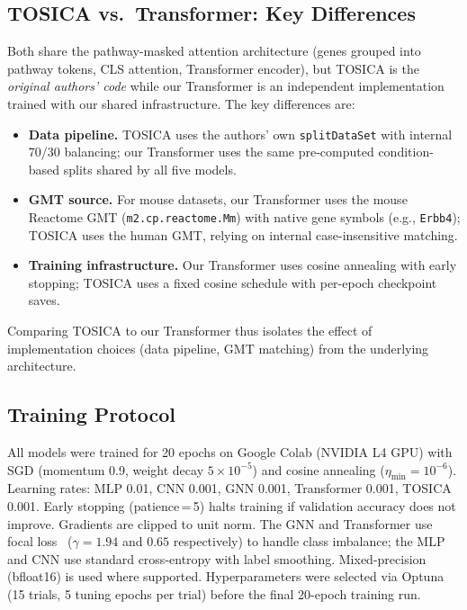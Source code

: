 \documentclass[11pt,letterpaper]{article}
\begin{document}
\subsection{TOSICA vs.\ Transformer: Key Differences}
Both share the pathway-masked attention architecture (genes grouped into pathway
tokens, CLS attention, Transformer encoder), but TOSICA is the \emph{original
authors' code} while our Transformer is an independent implementation trained
with our shared infrastructure. The key differences are:
\begin{itemize}
    \item \textbf{Data pipeline.} TOSICA uses the authors' own
    \texttt{splitDataSet} with internal 70/30 balancing; our Transformer uses
    the same pre-computed condition-based splits shared by all five models.
    \item \textbf{GMT source.} For mouse datasets, our Transformer uses the
    mouse Reactome GMT (\texttt{m2.cp.reactome.Mm}) with native gene symbols
    (e.g., \texttt{Erbb4}); TOSICA uses the human GMT, relying on internal
    case-insensitive matching.
    \item \textbf{Training infrastructure.} Our Transformer uses cosine
    annealing with early stopping; TOSICA uses a fixed cosine schedule with
    per-epoch checkpoint saves.
\end{itemize}
\noindent Comparing TOSICA to our Transformer thus isolates the effect of
implementation choices (data pipeline, GMT matching) from the underlying
architecture.

\subsection{Training Protocol}
All models were trained for 20 epochs on Google Colab (NVIDIA L4 GPU) with SGD
(momentum 0.9, weight decay $5{\times}10^{-5}$) and cosine annealing
($\eta_{\min}{=}10^{-6}$). Learning rates: MLP 0.01, CNN 0.001, GNN 0.001,
Transformer 0.001, TOSICA 0.001. Early stopping (patience\,=\,5) halts
training if validation accuracy does not improve. Gradients are clipped to unit
norm. The GNN and Transformer use focal loss~\cite{lin2017focal}
($\gamma{=}1.94$ and $0.65$ respectively) to handle class imbalance; the MLP
and CNN use standard cross-entropy with label smoothing. Mixed-precision
(bfloat16) is used where supported. Hyperparameters were selected via Optuna
(15 trials, 5 tuning epochs per trial) before the final 20-epoch training run.

\end{document}
